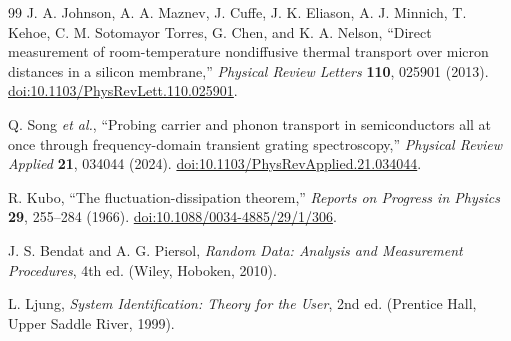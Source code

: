 \documentclass[11pt,letterpaper]{article}
\begin{document}
\begin{thebibliography}{99}
J. A. Johnson, A. A. Maznev, J. Cuffe, J. K. Eliason,
A. J. Minnich, T. Kehoe, C. M. Sotomayor Torres, G. Chen,
and K. A. Nelson,
``Direct measurement of room-temperature nondiffusive thermal
transport over micron distances in a silicon membrane,''
\textit{Physical Review Letters} \textbf{110}, 025901 (2013).
\href{https://doi.org/10.1103/PhysRevLett.110.025901}
{doi:10.1103/PhysRevLett.110.025901}.

Q. Song \textit{et al.},
``Probing carrier and phonon transport in semiconductors all at once
through frequency-domain transient grating spectroscopy,''
\textit{Physical Review Applied} \textbf{21}, 034044 (2024).
\href{https://doi.org/10.1103/PhysRevApplied.21.034044}
{doi:10.1103/PhysRevApplied.21.034044}.

R. Kubo,
``The fluctuation-dissipation theorem,''
\textit{Reports on Progress in Physics} \textbf{29}, 255--284 (1966).
\href{https://doi.org/10.1088/0034-4885/29/1/306}
{doi:10.1088/0034-4885/29/1/306}.

J. S. Bendat and A. G. Piersol,
\textit{Random Data: Analysis and Measurement Procedures},
4th ed. (Wiley, Hoboken, 2010).

L. Ljung,
\textit{System Identification: Theory for the User},
2nd ed. (Prentice Hall, Upper Saddle River, 1999).

\end{thebibliography}
\end{document}
